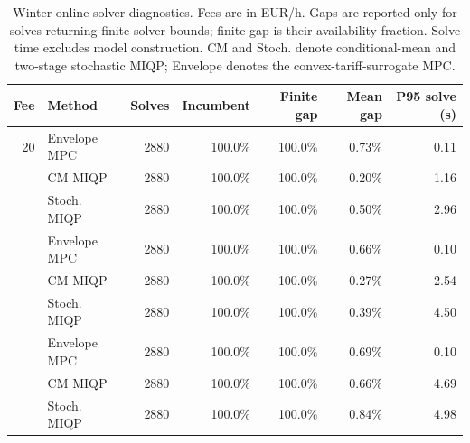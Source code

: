 \begin{table}[ht]
\centering
\small
\caption{Winter online-solver diagnostics. Fees are in EUR/h. Gaps are reported only for solves returning finite solver bounds; finite gap is their availability fraction. Solve time excludes model construction. CM and Stoch. denote conditional-mean and two-stage stochastic MIQP; Envelope denotes the convex-tariff-surrogate MPC.}
\label{tab:supp-solvers}
\begin{tabularx}{\linewidth}{r>{\raggedright\arraybackslash}Xrrrrr}
\toprule
Fee & Method & Solves & Incumbent & Finite gap & Mean gap & P95 solve (s) \\
\midrule
20 & Envelope MPC & 2880 & 100.0\% & 100.0\% & 0.73\% & 0.11 \\
 & CM MIQP & 2880 & 100.0\% & 100.0\% & 0.20\% & 1.16 \\
 & Stoch. MIQP & 2880 & 100.0\% & 100.0\% & 0.50\% & 2.96 \\
\addlinespace
40 & Envelope MPC & 2880 & 100.0\% & 100.0\% & 0.66\% & 0.10 \\
 & CM MIQP & 2880 & 100.0\% & 100.0\% & 0.27\% & 2.54 \\
 & Stoch. MIQP & 2880 & 100.0\% & 100.0\% & 0.39\% & 4.50 \\
\addlinespace
80 & Envelope MPC & 2880 & 100.0\% & 100.0\% & 0.69\% & 0.10 \\
 & CM MIQP & 2880 & 100.0\% & 100.0\% & 0.66\% & 4.69 \\
 & Stoch. MIQP & 2880 & 100.0\% & 100.0\% & 0.84\% & 4.98 \\
\bottomrule
\end{tabularx}
\end{table}

